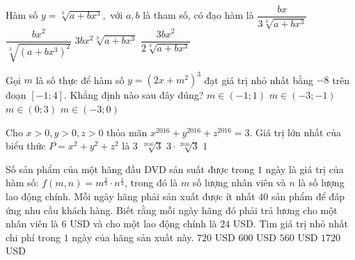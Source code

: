 \begin{ex}%
	Hàm số $y=\sqrt[3]{a+bx^3},$ với $a,b$ là tham số, có đạo hàm là
	\choice
	{$\dfrac{bx}{3\sqrt[3]{a+bx^3}}$}
	{\True $\dfrac{bx^2}{\sqrt[3]{\left(a+bx^3\right)^2}}$}
	{$3bx^2\sqrt[3]{a+bx^3}$}
	{$\dfrac{3bx^2}{2\sqrt[3]{a+bx^3}}$}
\end{ex}
\begin{ex}%
	Gọi $m$ là số thực để hàm số $y=\left(2x+m^2\right)^3$ đạt giá trị nhỏ nhất bằng $-8$ trên đoạn $[-1;4]$. Khẳng định nào sau đây đúng?
	\choice
	{\True $m\in(-1;1)$}
	{$m\in(-3;-1)$}
	{$m\in(0;3)$}
	{$m\in(-3;0)$}
\end{ex}
\begin{ex}%
	Cho $x>0,y>0,z>0$ thỏa mãn $x^{2016}+y^{2016}+z^{2016}=3$. Giá trị lớn nhất của biểu thức $P=x^2+y^2+z^2$ là
	\choice
	{\True $3$}
	{$\sqrt[2016]{3}$}
	{$3\cdot\sqrt[2016]{3}$}
	{$1$}
\end{ex}
\begin{ex}%
	Số sản phẩm của một hãng đầu DVD sản suất được trong $1$ ngày là giá trị của hàm số: $f(m,n)=m^{\tfrac{2}{3}}\cdot n^{\tfrac{1}{3}}$, trong đó là $m$ số lượng nhân viên và $n$ là số lượng lao động chính. Mỗi ngày hãng phải sản xuất được ít nhất $40$ sản phẩm để đáp ứng nhu cầu khách hàng. Biết rằng mỗi ngày hãng đó phải trả lương cho một nhân viên là $6$ USD và cho một lao động chính là $24$ USD. Tìm giá trị nhỏ nhất chi phí trong $1$ ngày của hãng sản xuất này. 
	\choice
	{\True $720$ USD}
	{$600$ USD}
	{$560$ USD}
	{$1720$ USD}
\end{ex}
